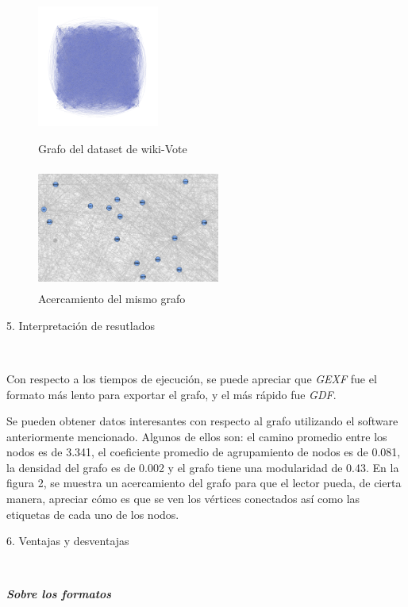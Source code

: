 \documentclass[12pt, letterpaper, twocolumn]{article}
\begin{document}
\begin{figure}[ht]
\center
	\includegraphics[width = 4cm, height = 4cm]{finalgraph} %
	\caption{Grafo del dataset de wiki-Vote}
	\label{fig:graph}

\break
	\includegraphics[width = 6cm, height = 4cm]{closeup} %
	\caption{Acercamiento del mismo grafo}
\end{figure}


\begin{description}
\item[{5. Interpretación de resutlados}]~
\end{description}

Con respecto a los tiempos de ejecución, se puede apreciar que \textit{GEXF} fue el formato más lento para exportar el grafo, y el más rápido fue \textit{GDF}. 

Se pueden obtener datos interesantes con respecto al grafo utilizando el software anteriormente mencionado. Algunos de ellos son: el camino promedio entre los nodos es de 3.341, el coeficiente promedio de agrupamiento de nodos es de 0.081, la densidad del grafo es de 0.002 y el grafo tiene una modularidad de 0.43. En la figura 2, se muestra un acercamiento del grafo para que el lector pueda, de cierta manera, apreciar cómo es que se ven los vértices conectados así como las etiquetas de cada uno de los nodos. 

\begin{description}
\item[{6. Ventajas y desventajas}]~
\end{description}

\textbf{\emph{Sobre los formatos}}
\end{document}
